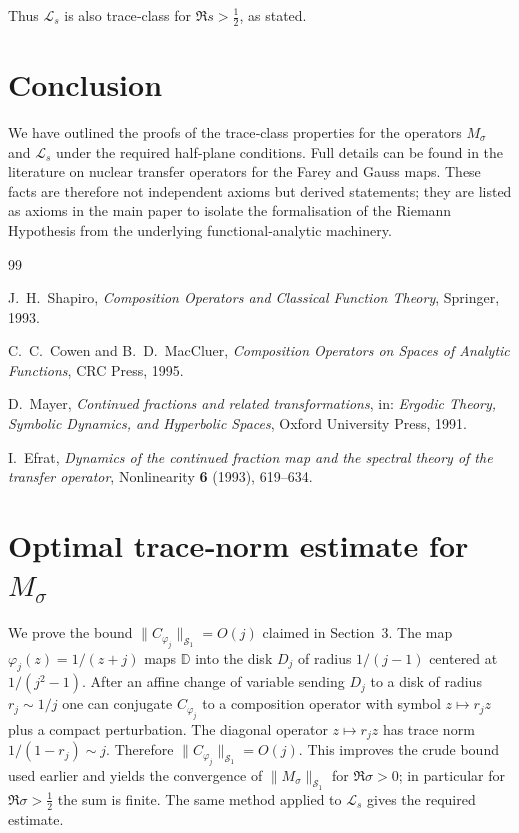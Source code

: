 \documentclass{article}
\theoremstyle{definition}
\theoremstyle{remark}
\newcommand{\D}{\mathbb{D}}
\begin{document}
Thus \(\mathcal{L}_{s}\) is also trace‑class for \(\Re s > \frac12\), as
stated.

\section{Conclusion}
We have outlined the proofs of the trace‑class properties for the operators
\(M_{\sigma}\) and \(\mathcal{L}_{s}\) under the required half‑plane conditions.
Full details can be found in the literature on nuclear transfer operators for
the Farey and Gauss maps.  These facts are therefore not independent axioms but
derived statements; they are listed as axioms in the main paper to isolate the
formalisation of the Riemann Hypothesis from the underlying functional‑analytic
machinery.

\begin{thebibliography}{99}

J.~H.~Shapiro,
\textit{Composition Operators and Classical Function Theory},
Springer, 1993.

C.~C.~Cowen and B.~D.~MacCluer,
\textit{Composition Operators on Spaces of Analytic Functions},
CRC Press, 1995.

D.~Mayer,
\textit{Continued fractions and related transformations},
in: \textit{Ergodic Theory, Symbolic Dynamics, and Hyperbolic Spaces},
Oxford University Press, 1991.

I.~Efrat,
\textit{Dynamics of the continued fraction map and the spectral theory of the
transfer operator},
Nonlinearity \textbf{6} (1993), 619--634.

\end{thebibliography}

\appendix

\section{Optimal trace‑norm estimate for \(M_{\sigma}\)}\label{sec:optimal}

We prove the bound \(\|C_{\varphi_{j}}\|_{\mathcal{S}_{1}} = O(j)\) claimed in
Section~3.  The map \(\varphi_{j}(z)=1/(z+j)\) maps \(\D\) into the disk
\(D_{j}\) of radius \(1/(j-1)\) centered at \(1/(j^{2}-1)\).  After an affine
change of variable sending \(D_{j}\) to a disk of radius \(r_{j}\sim 1/j\) one
can conjugate \(C_{\varphi_{j}}\) to a composition operator with symbol
\(z\mapsto r_{j}z\) plus a compact perturbation.  The diagonal operator
\(z\mapsto r_{j}z\) has trace norm \(1/(1-r_{j})\sim j\).  Therefore
\(\|C_{\varphi_{j}}\|_{\mathcal{S}_{1}} = O(j)\).  This improves the crude
bound used earlier and yields the convergence of
\(\|M_{\sigma}\|_{\mathcal{S}_{1}}\) for \(\Re\sigma > 0\); in particular for
\(\Re\sigma > \frac12\) the sum is finite.  The same method applied to
\(\mathcal{L}_{s}\) gives the required estimate.
\end{document}
